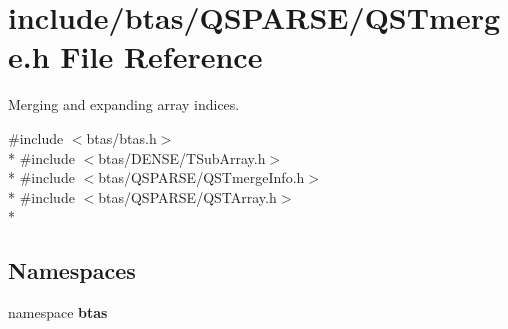 \section{include/btas/\-Q\-S\-P\-A\-R\-S\-E/\-Q\-S\-Tmerge.h File Reference}
\label{dd/df2/QSTmerge_8h}


Merging and expanding array indices.  


{\ttfamily \#include $<$btas/btas.\-h$>$}\\*
{\ttfamily \#include $<$btas/\-D\-E\-N\-S\-E/\-T\-Sub\-Array.\-h$>$}\\*
{\ttfamily \#include $<$btas/\-Q\-S\-P\-A\-R\-S\-E/\-Q\-S\-Tmerge\-Info.\-h$>$}\\*
{\ttfamily \#include $<$btas/\-Q\-S\-P\-A\-R\-S\-E/\-Q\-S\-T\-Array.\-h$>$}\\*
\subsection*{Namespaces}
\begin{DoxyCompactItemize}
\item 
namespace {\bf btas}
\end{DoxyCompactItemize}
